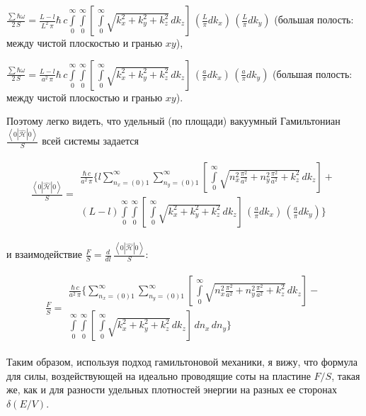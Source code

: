 \documentclass[11pt]{article}
\begin{document}
\(\frac{\sum\hbar\omega}{2\,S} = \frac{L-l}{L^2\,\pi}\hbar\,c\int\limits_{0}^{\infty}\int\limits_{0}^{\infty}\left[\,\int\limits_{0}^{\infty}\sqrt{k_x^2+k_y^2+k_z^2}\,dk_z\right]\,\left(\frac{L}{\pi}dk_x\right)\,\left(\frac{L}{\pi}dk_y\right)\)
(большая полость: между чистой плоскостью и гранью \(xy\)),

\(\frac{\sum\hbar\omega}{2\,S} = \frac{L-l}{a^2\,\pi}\hbar\,c\int\limits_{0}^{\infty}\int\limits_{0}^{\infty}\left[\,\int\limits_{0}^{\infty}\sqrt{k_x^2+k_y^2+k_z^2}\,dk_z\right]\,\left(\frac{a}{\pi}dk_x\right)\,\left(\frac{a}{\pi}dk_y\right)\)
(большая полость: между чистой плоскостью и гранью \(xy\)).

    Поэтому легко видеть, что удельный (по площади) вакуумный Гамильтониан
\(\frac{\left<0|\hat{\mathcal{H}}|0\right>}{S}\) всей системы задается

\[\begin{array}{lr}
\frac{\left<0|\hat{\mathcal{H}}|0\right>}{S} =
\begin{array}{c}\frac{\hbar\,c}{a^2\,\pi}\Bigg\{l\sum\limits_{n_x=(0)1}^{\infty}\sum\limits_{n_y=(0)1}^{\infty}\left[\,\int\limits_{0}^{\infty}\sqrt{n_x^2\frac{\pi^2}{a^2}+n_y^2\frac{\pi^2}{a^2}+k_z^2}\,dk_z\right] + \\
(L-l)\int\limits_{0}^{\infty}\int\limits_{0}^{\infty}\left[\,\int\limits_{0}^{\infty}\sqrt{k_x^2+k_y^2+k_z^2}\,dk_z\right]\,\left(\frac{a}{\pi}dk_x\right)\,\left(\frac{a}{\pi}dk_y\right)\Bigg\}
\end{array}\end{array}\]

и взаимодействие
\(\frac{F}{S} = \frac{d}{dl} \,\frac{\left<0|\hat{\mathcal{H}}|0\right>}{S}\):

\[\begin{array}{lr}\frac{F}{S} =
\begin{array}{c}\frac{\hbar\,c}{a^2\,\pi}\Bigg\{\sum\limits_{n_x=(0)1}^{\infty}\sum\limits_{n_y=(0)1}^{\infty}\left[\,\int\limits_{0}^{\infty}\sqrt{n_x^2\frac{\pi^2}{a^2}+n_y^2\frac{\pi^2}{a^2}+k_z^2}\,dk_z\right] - \\
\int\limits_{0}^{\infty}\int\limits_{0}^{\infty}\left[\,\int\limits_{0}^{\infty}\sqrt{k_x^2+k_y^2+k_z^2}\,dk_z\right]\,dn_x\,dn_y\Bigg\}\end{array}\end{array}\]

    Таким образом, используя подход гамильтоновой механики, я вижу, что
формула для силы, воздействующей на идеально проводящие соты на пластине
\({F}/{S}\), такая же, как и для разности удельных плотностей энергии на
разных ее сторонах \(\delta\left({E}/{V}\right)\).
\end{document}
